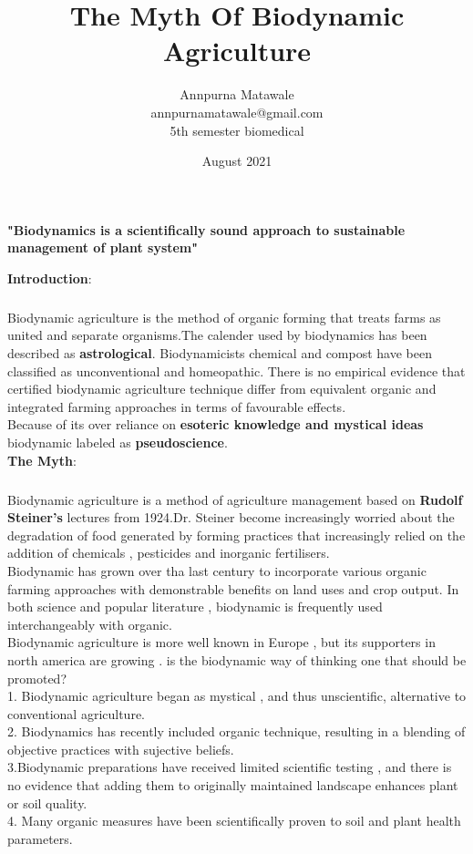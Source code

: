 \documentclass[12pt]{article}
\title{\textbf{The Myth Of Biodynamic Agriculture}}
\author{Annpurna Matawale\\ annpurnamatawale@gmail.com\\5th semester biomedical }
\date{August 2021}
\begin{document}
\maketitle

\textbf{"Biodynamics is a scientifically sound approach to sustainable management of plant system"}




{\textbf{Introduction}}:\subparagraph{
} Biodynamic agriculture is the method of organic forming that treats farms as united and separate organisms.The calender used by biodynamics has been described as \textbf{astrological}. Biodynamicists chemical and compost have been classified as unconventional and homeopathic. There is no empirical evidence that certified biodynamic agriculture technique differ from equivalent organic and integrated farming approaches in terms of favourable effects. \\ Because of its over reliance on \textbf{esoteric knowledge and mystical ideas} biodynamic labeled as \textbf{pseudoscience}.\\



\textbf{The Myth}: \subparagraph{}
Biodynamic agriculture is a method of agriculture management based on\textbf{ Rudolf Steiner's} lectures from 1924.Dr. Steiner become increasingly worried about the degradation of food generated by forming practices that increasingly relied on the addition of chemicals , pesticides and inorganic fertilisers.\\ Biodynamic has grown over tha last century to incorporate various organic farming approaches with demonstrable benefits on land uses and crop output. In both science and popular literature , biodynamic is frequently used interchangeably with organic. \\ Biodynamic agriculture is more well known in Europe , but its supporters in north america are growing . is the biodynamic way of thinking one that should be promoted?\\




 1. Biodynamic agriculture began as mystical , and thus unscientific, alternative to conventional agriculture.\\
 2. Biodynamics has recently included organic technique, resulting in a blending of objective practices with sujective beliefs.\\
 3.Biodynamic preparations have received limited scientific testing , and there is no evidence that adding them to originally maintained landscape enhances plant or soil quality.\\
 4. Many organic measures have been scientifically proven to soil and plant health parameters.
\end{document}
